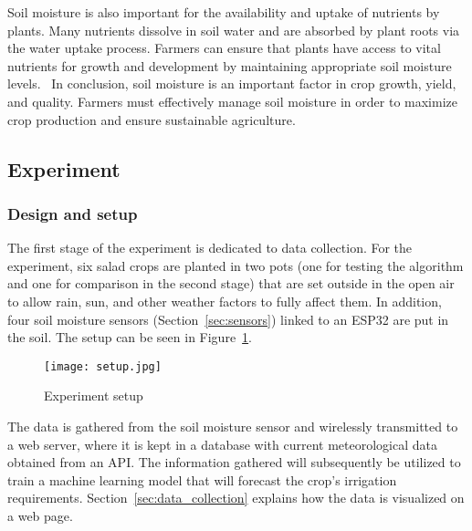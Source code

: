 \documentclass[11pt]{scrartcl} %
\begin{document}
\newline Soil moisture is also important for the availability and uptake of nutrients by plants. Many nutrients dissolve in soil water and are absorbed by plant roots via the water uptake process. Farmers can ensure that plants have access to vital nutrients for growth and development by maintaining appropriate soil moisture levels.~\parencite{soil_moisture_plant_water}
\newline In conclusion, soil moisture is an important factor in crop growth, yield, and quality. Farmers must effectively manage soil moisture in order to maximize crop production and ensure sustainable agriculture.


\subsection{Experiment}
\subsubsection{Design and setup}
The first stage of the experiment is dedicated to data collection. For the experiment, six salad crops are planted in two pots (one for testing the algorithm and one for comparison in the second stage) that are set outside in the open air to allow rain, sun, and other weather factors to fully affect them. In addition, four soil moisture sensors (Section~\ref{sec:sensors}) linked to an ESP32 are put in the soil. The setup can be seen in Figure~\ref{fig:experiment_setup}.
\begin{figure}[h]
	\centering
	\texttt{[image: setup.jpg]}
	\caption{Experiment setup}
	\label{fig:experiment_setup}
\end{figure}
The data is gathered from the soil moisture sensor and wirelessly transmitted to a web server, where it is kept in a database with current meteorological data obtained from an API. The information gathered will subsequently be utilized to train a machine learning model that will forecast the crop's irrigation requirements. Section~\ref{sec:data_collection} explains how the data is visualized on a web page.
\end{document}
